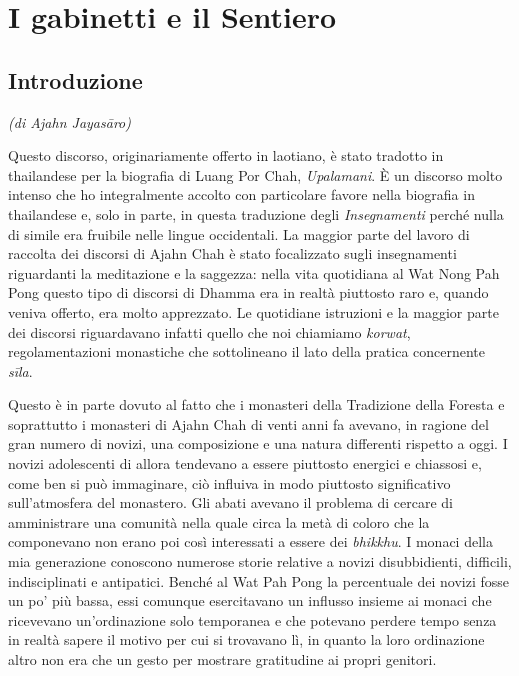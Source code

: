 \chapter{I gabinetti e il Sentiero}

\section{Introduzione}

\emph{(di Ajahn Jayasāro)}

Questo discorso,
originariamente offerto in laotiano, è stato tradotto in thailandese per
la biografia di Luang Por Chah, \emph{Upalamani}. È un discorso molto
intenso che ho integralmente accolto con particolare favore nella
biografia in thailandese e, solo in parte, in questa traduzione degli
\emph{Insegnamenti} perché nulla di simile era fruibile nelle lingue
occidentali. La maggior parte del lavoro di raccolta dei discorsi di
Ajahn Chah è stato focalizzato sugli insegnamenti riguardanti la
meditazione e la saggezza: nella vita quotidiana al Wat Nong Pah Pong
questo tipo di discorsi di Dhamma era in realtà piuttosto raro e, quando
veniva offerto, era molto apprezzato. Le quotidiane istruzioni e la
maggior parte dei discorsi riguardavano infatti quello che noi chiamiamo
\emph{korwat}, regolamentazioni monastiche che sottolineano il lato
della pratica concernente \emph{sīla}.

Questo è in parte dovuto al fatto che i monasteri della Tradizione della
Foresta e soprattutto i monasteri di Ajahn Chah di venti anni fa
avevano, in ragione del gran numero di novizi, una composizione e una
natura differenti rispetto a oggi. I novizi adolescenti di allora
tendevano a essere piuttosto energici e chiassosi e, come ben si può
immaginare, ciò influiva in modo piuttosto significativo sull'atmosfera
del monastero. Gli abati avevano il problema di cercare di amministrare
una comunità nella quale circa la metà di coloro che la componevano non
erano poi così interessati a essere dei \emph{bhikkhu}. I monaci della
mia generazione conoscono numerose storie relative a novizi
disubbidienti, difficili, indisciplinati e antipatici. Benché al Wat Pah
Pong la percentuale dei novizi fosse un po' più bassa, essi comunque
esercitavano un influsso insieme ai monaci che ricevevano un'ordinazione
solo temporanea e che potevano perdere tempo senza in realtà sapere il
motivo per cui si trovavano lì, in quanto la loro ordinazione altro non
era che un gesto per mostrare gratitudine ai propri genitori.

